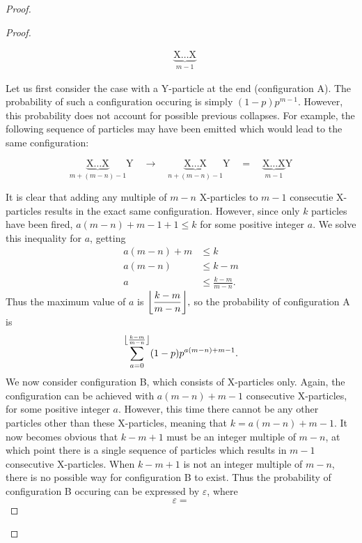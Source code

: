 \begin{proof}
\begin{proof}
\begin{figure}[H]
\begin{align*}
        &\underbrace{\text{X}\dots\text{X}}_{m-1} \tag{B}
      \end{align*}
      \vspace{-2em}
    \end{figure}
    Let us first consider the case with a Y-particle at the end (configuration A). The probability of such a configuration occuring is simply $(1-p)p^{m-1}$. However, this probability does not account for possible previous collapses. For example, the following sequence of particles may have been emitted which would lead to the same configuration:
    \begin{figure}[H]
      \vspace{-1.5em}
      \begin{equation*}
        \underbrace{\text{X}\dots\text{X}}_{m + (m-n) - 1}\text{Y} \quad \longrightarrow \quad \underbrace{\text{X}\dots\text{X}}_{n+(m-n)-1}\text{Y}\quad = \quad \underbrace{\text{X}\dots\text{X}}_{m-1}\text{Y} 
      \end{equation*}
      \vspace{-2em}
    \end{figure}
    It is clear that adding any multiple of $m-n$ X-particles to $m-1$ consecutie X-particles results in the exact same configuration. However, since only $k$ particles have been fired, $a(m-n) + m-1 + 1 \le k$ for some positive integer $a$. We solve this inequality for $a$, getting
    \begin{align*}
      a(m-n) + m &\le k \\
      a(m-n) &\le k - m \\
      a &\le \frac{k-m}{m-n}.
    \end{align*}
    Thus the maximum value of $a$ is $\floor*{\dfrac{k-m}{m-n}},$ so the probability of configuration A is \[
      \sum_{a=0}^{\floor*{\frac{k-m}{m-n}}} (1-p)p^{a(m-n)+m-1}
    .\]
    We now consider configuration B, which consists of X-particles only. Again, the configuration can be achieved with $a(m-n) + m-1$ consecutive X-particles, for some positive integer $a$. However, this time there cannot be any other particles other than these X-particles, meaning that  $k = a(m-n) + m-1$. It now becomes obvious that $k-m+1$ must be an integer multiple of $m-n$, at which point there is a single sequence of particles which results in $m-1$ consecutive X-particles. When $k-m+1$ is not an integer multiple of $m-n$, there is no possible way for configuration B to exist. Thus the probability of configuration B occuring can be expressed by $\varepsilon$, where \[
      \varepsilon = 
\]
\end{proof}
\end{proof}
